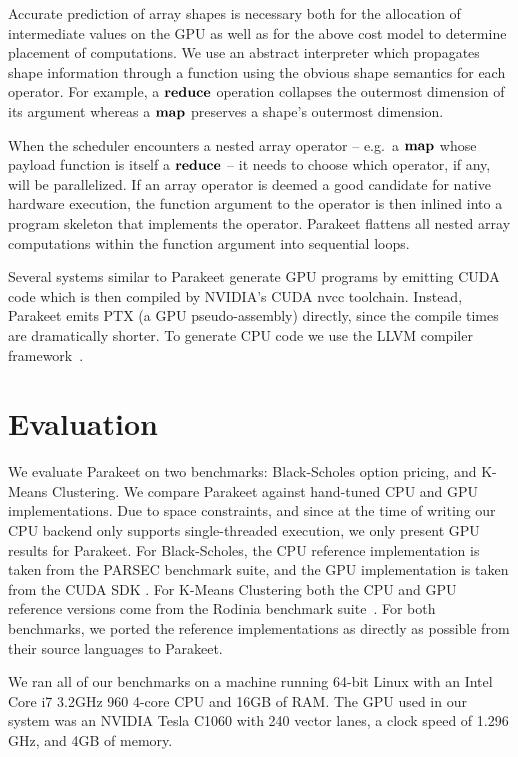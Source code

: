 \documentclass[10pt,twocolumn]{article}
\begin{document}
Accurate prediction of array shapes is necessary both for the allocation of intermediate values on the GPU as well as for the above cost model to determine placement of computations. We use an abstract interpreter which propagates shape information through a function using the obvious shape semantics for each operator. For example, a $\mbox{\textbf{reduce}}$ operation collapses the outermost dimension of its argument whereas a $\mbox{\textbf{map}}$ preserves a shape's outermost dimension.

When the scheduler encounters a nested array operator -- e.g.~a $\mbox{\textbf{map}}$ whose payload function is itself a $\mbox{\textbf{reduce}}$ -- it needs to choose which operator, if any, will be parallelized.  If an array operator is deemed a good candidate for native hardware execution, the function argument to the operator is then inlined into a program skeleton that implements the operator. Parakeet flattens all nested array computations within the function argument into sequential loops.

Several systems similar to Parakeet \cite{Cata11,Chaf11} generate GPU programs by emitting CUDA code which is then compiled by NVIDIA's CUDA nvcc toolchain. Instead, Parakeet emits PTX (a GPU pseudo-assembly) directly, since the compile times are dramatically shorter. To generate CPU code we use the LLVM compiler framework~\cite{Latt02}.

\section{Evaluation}
\label{Evaluation}

We evaluate Parakeet on two benchmarks: Black-Scholes option pricing, and K-Means Clustering.  We compare Parakeet against hand-tuned CPU and GPU implementations.  Due to space constraints, and since at the time of writing our CPU backend only supports single-threaded execution, we only present GPU results for Parakeet.  For Black-Scholes, the CPU reference implementation is taken from the PARSEC \cite{Bien08} benchmark suite, and the GPU implementation is taken from the CUDA SDK \cite{NvidSD}.  For K-Means Clustering both the CPU and GPU reference versions come from the Rodinia benchmark suite~\cite{Che09}.  For both benchmarks, we ported the reference implementations as directly as possible from their source languages to Parakeet.

We ran all of our benchmarks on a machine running 64-bit Linux with an Intel Core i7 3.2GHz 960 4-core CPU  and 16GB of RAM.  The GPU used in our system was an NVIDIA Tesla C1060 with 240 vector lanes, a clock speed of 1.296 GHz, and 4GB of memory.
\end{document}
